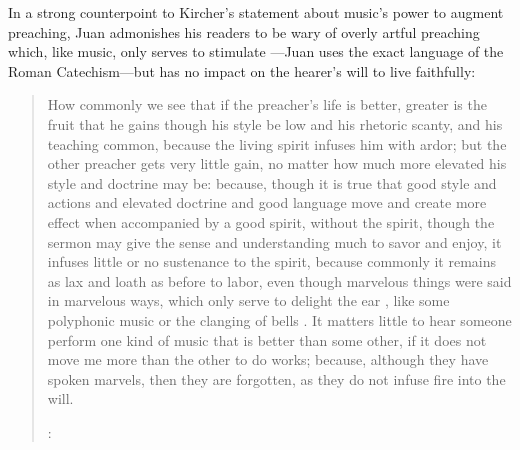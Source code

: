 In a strong counterpoint to Kircher's statement about music's power to augment preaching, Juan admonishes his readers to be wary of overly artful preaching which, like music, only serves to stimulate ---Juan uses the exact language of the Roman Catechism---but has no impact on the hearer's will to live faithfully:
\begin{quote}
    How commonly we see that \Dots{} if the preacher's life is better, greater is the fruit that he gains though his style be low and his rhetoric scanty, and his teaching common, because the living spirit infuses him with ardor;
    but the other preacher gets very little gain, no matter how much more elevated his style and doctrine may be: because, though it is true that good style and actions and elevated doctrine and good language move and create more effect when accompanied by a good spirit, without the spirit, though the sermon may give the sense and understanding much to savor and enjoy, it infuses little or no sustenance to the spirit, because commonly it remains as lax and loath as before to labor, even though marvelous things were said in marvelous ways, which only serve to delight the ear , like some polyphonic music  or the clanging of bells \Dots{}.
    It matters little to hear someone perform one kind of music that is better than some other, if it does not move me more than the other to do works; because, although they have spoken marvels, then they are forgotten, as they do not infuse fire into the will.%
    \begin{Footnote}
        \Autocite[bk.~3, ch.~45, 425]{JuandelaCruz:Subida}:
    \end{Footnote}
\end{quote}

